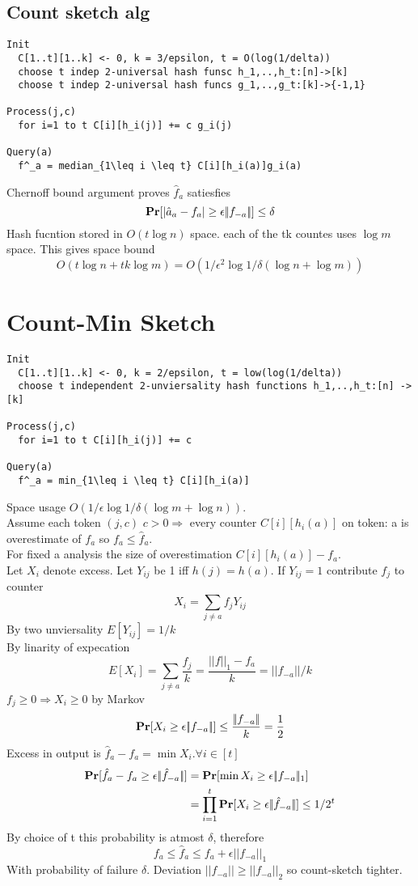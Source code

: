 \documentclass[a4paper]{article}
\def\Pr{\mbox{\textbf{Pr}}}
\begin{document}
\subsection{Count sketch alg}
\begin{verbatim}
Init
  C[1..t][1..k] <- 0, k = 3/epsilon, t = O(log(1/delta))
  choose t indep 2-universal hash funsc h_1,..,h_t:[n]->[k]
  choose t indep 2-universal hash funcs g_1,..,g_t:[k]->{-1,1}

Process(j,c)
  for i=1 to t C[i][h_i(j)] += c g_i(j)

Query(a)
  f^_a = median_{1\leq i \leq t} C[i][h_i(a)]g_i(a)

\end{verbatim}
Chernoff bound argument proves \(\hat{f}_a\) satiesfies
\[\Pr[|\hat{a}_a-f_a|\geq \epsilon|\!| f_{-a}|\!|] \leq \delta\]
Hash fucntion stored in \(O(t\log n)\) space. each of the tk countes uses \(\log m\) space. This gives space bound 
\[O(t \log n + tk \log m) = O(1/\epsilon^2 \log 1/\delta(\log n + \log m))\]
\section{Count-Min Sketch}
\begin{verbatim}
Init
  C[1..t][1..k] <- 0, k = 2/epsilon, t = low(log(1/delta))
  choose t independent 2-unviersality hash functions h_1,..,h_t:[n] -> [k]

Process(j,c)
  for i=1 to t C[i][h_i(j)] += c

Query(a)
  f^_a = min_{1\leq i \leq t} C[i][h_i(a)]
\end{verbatim}
Space usage \(O(1/\epsilon \log 1/\delta (\log m + \log n))\).\\
Assume each token \((j,c)\) \(c>0 \Rightarrow\) every counter \(C[i][h_i(a)]\) on token: a is overestimate of \(f_a\) so \(f_a \leq \hat{f}_a\).\\
For fixed a analysis the size of overestimation \(C[i][h_i(a)]-f_a\).\\
Let \(X_i\) denote excess. Let \(Y_{ij}\) be 1 iff \(h(j)=h(a)\). If \(Y_{ij}=1\) contribute \(f_j\) to counter
\[X_i = \sum_{j\neq a} f_jY_{ij}\]
By two unviersality \(E[Y_{ij}]=1/k\)\\
By linarity of expecation
\[E[X_i] = \sum_{j\neq a} \frac{f_j}{k} = \frac{|\!|f|\!|_1 - f_a}{k} = |\!| f_{-a} |\!|/k\]
\(f_j \geq 0 \Rightarrow X_i \geq 0\) by Markov
\[\Pr[X_i \geq \epsilon |\!| f_{-a}|\!|] \leq \frac{|\!|f_{-a}|\!|}{k} = \frac{1}{2}\]
Excess in output is \(\hat{f}_a-f_a=\min X_i.\forall i \in [t]\)
\begin{align}
\Pr[\hat{f}_a-f_a \geq \epsilon |\!|\hat{f}_{-a}|\!|] &= \Pr[\min{X_i} \geq \epsilon |\!|f_{-a}|\!|_1]\\
                                                      &= \prod^t_{i=1} \Pr[X_i \geq \epsilon |\!|\hat{f}_{-a}|\!|]
                                                      \leq 1/2^t
\end{align}
By choice of t this probability is atmost \(\delta\), therefore
\[f_a \leq \hat{f}_a \leq f_a + \epsilon|\!|f_{-a}|\!|_1\]
With probability of failure \(\delta\). Deviation \(|\!|f_{-a}|\!| \geq |\!|f_{-a}|\!|_2\) so count-sketch tighter.
\end{document}
